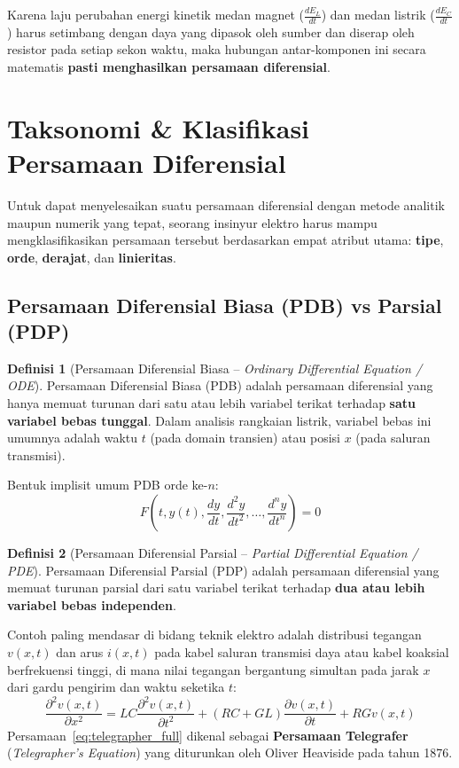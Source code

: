 \documentclass[11pt,a4paper]{article}
\theoremstyle{definition}
\newtheorem{definition}{Definisi}[section]
\begin{document}
Karena laju perubahan energi kinetik medan magnet ($\frac{dE_L}{dt}$) dan medan listrik ($\frac{dE_C}{dt}$) harus setimbang dengan daya yang dipasok oleh sumber dan diserap oleh resistor pada setiap sekon waktu, maka hubungan antar-komponen ini secara matematis \textbf{pasti menghasilkan persamaan diferensial}.


\section{Taksonomi \& Klasifikasi Persamaan Diferensial}

Untuk dapat menyelesaikan suatu persamaan diferensial dengan metode analitik maupun numerik yang tepat, seorang insinyur elektro harus mampu mengklasifikasikan persamaan tersebut berdasarkan empat atribut utama: \textbf{tipe}, \textbf{orde}, \textbf{derajat}, dan \textbf{linieritas}.

\subsection{Persamaan Diferensial Biasa (PDB) vs Parsial (PDP)}

\begin{definition}[Persamaan Diferensial Biasa -- \textit{Ordinary Differential Equation / ODE}]
Persamaan Diferensial Biasa (PDB) adalah persamaan diferensial yang hanya memuat turunan dari satu atau lebih variabel terikat terhadap \textbf{satu variabel bebas tunggal}. Dalam analisis rangkaian listrik, variabel bebas ini umumnya adalah waktu $t$ (pada domain transien) atau posisi $x$ (pada saluran transmisi).
\end{definition}

Bentuk implisit umum PDB orde ke-$n$:
\begin{equation}
    F\left(t, y(t), \frac{dy}{dt}, \frac{d^2y}{dt^2}, \dots, \frac{d^ny}{dt^n}\right) = 0
    \label{eq:implicit_ode}
\end{equation}

\begin{definition}[Persamaan Diferensial Parsial -- \textit{Partial Differential Equation / PDE}]
Persamaan Diferensial Parsial (PDP) adalah persamaan diferensial yang memuat turunan parsial dari satu variabel terikat terhadap \textbf{dua atau lebih variabel bebas independen}.
\end{definition}

Contoh paling mendasar di bidang teknik elektro adalah distribusi tegangan $v(x,t)$ dan arus $i(x,t)$ pada kabel saluran transmisi daya atau kabel koaksial berfrekuensi tinggi, di mana nilai tegangan bergantung simultan pada jarak $x$ dari gardu pengirim dan waktu seketika $t$:
\begin{equation}
    \frac{\partial^2 v(x,t)}{\partial x^2} = L C \frac{\partial^2 v(x,t)}{\partial t^2} + (R C + G L) \frac{\partial v(x,t)}{\partial t} + R G v(x,t)
    \label{eq:telegrapher_full}
\end{equation}
Persamaan~\eqref{eq:telegrapher_full} dikenal sebagai \textbf{Persamaan Telegrafer} (\textit{Telegrapher's Equation}) yang diturunkan oleh Oliver Heaviside pada tahun 1876.
\end{document}
